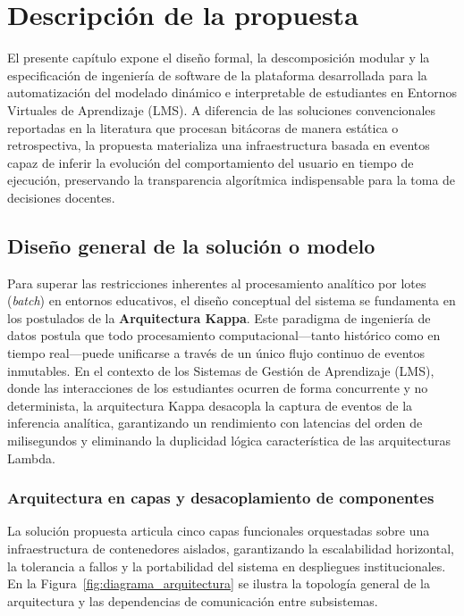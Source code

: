 \chapter{Descripción de la propuesta}
\label{cap:descripcion_propuesta}

El presente capítulo expone el diseño formal, la descomposición modular y la especificación de ingeniería de software de la plataforma desarrollada para la automatización del modelado dinámico e interpretable de estudiantes en Entornos Virtuales de Aprendizaje (LMS). A diferencia de las soluciones convencionales reportadas en la literatura que procesan bitácoras de manera estática o retrospectiva, la propuesta materializa una infraestructura basada en eventos capaz de inferir la evolución del comportamiento del usuario en tiempo de ejecución, preservando la transparencia algorítmica indispensable para la toma de decisiones docentes.

\section{Diseño general de la solución o modelo}
\label{sec:diseno_general}

Para superar las restricciones inherentes al procesamiento analítico por lotes (\textit{batch}) en entornos educativos, el diseño conceptual del sistema se fundamenta en los postulados de la \textbf{Arquitectura Kappa}. Este paradigma de ingeniería de datos postula que todo procesamiento computacional—tanto histórico como en tiempo real—puede unificarse a través de un único flujo continuo de eventos inmutables. En el contexto de los Sistemas de Gestión de Aprendizaje (LMS), donde las interacciones de los estudiantes ocurren de forma concurrente y no determinista, la arquitectura Kappa desacopla la captura de eventos de la inferencia analítica, garantizando un rendimiento con latencias del orden de milisegundos y eliminando la duplicidad lógica característica de las arquitecturas Lambda.

\subsection{Arquitectura en capas y desacoplamiento de componentes}

La solución propuesta articula cinco capas funcionales orquestadas sobre una infraestructura de contenedores aislados, garantizando la escalabilidad horizontal, la tolerancia a fallos y la portabilidad del sistema en despliegues institucionales. En la Figura~\ref{fig:diagrama_arquitectura} se ilustra la topología general de la arquitectura y las dependencias de comunicación entre subsistemas.

